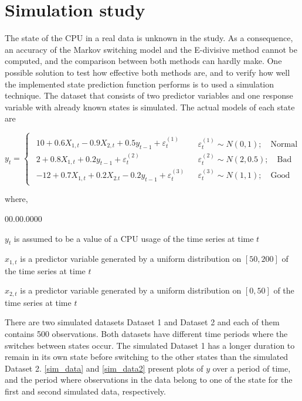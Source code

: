 \section{Simulation study}

The state of the CPU in a real data is unknown in the study. As a
consequence, an accuracy of the Markov switching model and the E-divisive
method cannot be computed, and the comparison between both methods
can hardly make. One possible solution to test how effective both
methods are, and to verify how well the implemented state prediction
function performs is to used a simulation technique. The dataset that
consists of two predictor variables and one response variable with
already known states is simulated. The actual models of each state
are 

\[
y_{t}=\begin{cases}
\begin{array}{c}
10+0.6X_{1,t}-0.9X{}_{2,t}+0.5y_{t-1}+\varepsilon_{t}^{(1)}\\
2+0.8X_{1,t}+0.2y_{t-1}+\varepsilon_{t}^{(2)}\\
-12+0.7X_{1,t}+0.2X{}_{2.t}-0.2y_{t-1}+\varepsilon_{t}^{(3)}
\end{array} & \begin{array}{c}
\varepsilon_{t}^{(1)}\sim N(0,1);\quad\mathrm{Normal}\\
\varepsilon_{t}^{(2)}\sim N(2,0.5);\quad\mathrm{Bad}\\
\varepsilon_{t}^{(3)}\sim N(1,1);\quad\mathrm{Good}
\end{array}\end{cases}
\]

where, 
\begin{labeling}{00.00.0000}
\item [{$y_{t}$}] is assumed to be a value of a CPU usage of the time
series at time $t$
\item [{$x_{1,t}$}] is a predictor variable generated by a uniform distribution
on $[50,200]$ of the time series at time $t$
\item [{$x_{2,t}$}] is a predictor variable generated by a uniform distribution
on $[0,50]$ of the time series at time $t$
\end{labeling}
There are two simulated datasets \textendash{} Dataset 1 and Dataset
2 \textendash{} and each of them contains 500 observations. Both datasets
have different time periods where the switches between states occur.
The simulated Dataset 1 has a longer duration to remain in its own
state before switching to the other states than the simulated Dataset
2. \ref{sim_data} and \ref{sim_data2} present plots of $y$ over
a period of time, and the period where observations in the data belong
to one of the state for the first and second simulated data, respectively.


